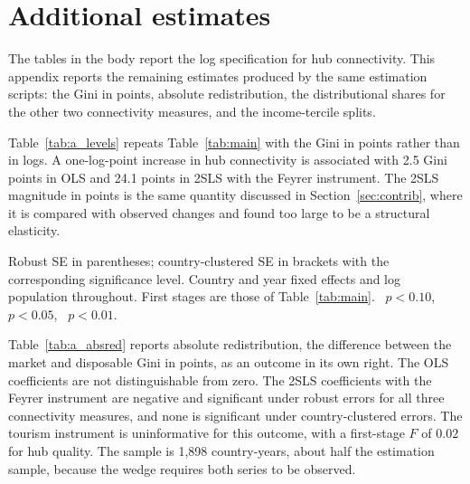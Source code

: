 
\appendix
\section{Additional estimates}
\label{app:additional}
The tables in the body report the log specification for hub connectivity. This appendix reports the remaining estimates produced by the same estimation scripts: the Gini in points, absolute redistribution, the distributional shares for the other two connectivity measures, and the income-tercile splits.

Table~\ref{tab:a_levels} repeats Table~\ref{tab:main} with the Gini in points rather than in logs. A one-log-point increase in hub connectivity is associated with 2.5 Gini points in OLS and 24.1 points in 2SLS with the Feyrer instrument. The 2SLS magnitude in points is the same quantity discussed in Section~\ref{sec:contrib}, where it is compared with observed changes and found too large to be a structural elasticity.

\begin{table}[H]\centering\caption{Main results with the Gini measured in points.}\label{tab:a_levels}
\begin{threeparttable}\small
\begin{tablenotes}\footnotesize\item Robust SE in parentheses; country-clustered SE in brackets with the corresponding significance level. Country and year fixed effects and log population throughout. First stages are those of Table~\ref{tab:main}. \sym{*}~$p<0.10$, \sym{**}~$p<0.05$, \sym{***}~$p<0.01$.\end{tablenotes}\end{threeparttable}\end{table}

Table~\ref{tab:a_absred} reports absolute redistribution, the difference between the market and disposable Gini in points, as an outcome in its own right. The OLS coefficients are not distinguishable from zero. The 2SLS coefficients with the Feyrer instrument are negative and significant under robust errors for all three connectivity measures, and none is significant under country-clustered errors. The tourism instrument is uninformative for this outcome, with a first-stage $F$ of $0.02$ for hub quality. The sample is 1,898 country-years, about half the estimation sample, because the wedge requires both series to be observed.

